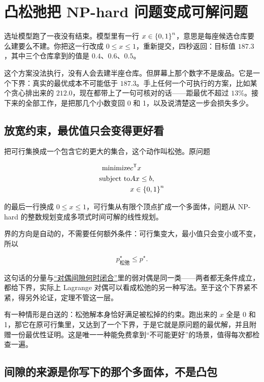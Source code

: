 \section{凸松弛把 NP-hard 问题变成可解问题}
\label{sec:09-Convex-Optimization/09-Complexity-and-Approximation/02}

选址模型跑了一夜没有结束。模型里有一行 \(x\in\left\{0,1\right\}^{n}\)，意思是每座候选仓库要么建要么不建。你把这一行改成 \(0\le x\le1\)，重新提交，四秒返回：目标值 \(187.3\)，其中三个仓库拿到的值是 \(0.4\)、\(0.6\)、\(0.5\)。

这个方案没法执行，没有人会去建半座仓库。但屏幕上那个数字不是废品。它是一个下界：真实的最优成本不可能低于 \(187.3\)。手上任何一个可执行的方案，比如某个贪心排出来的 \(212.0\)，现在都带上了一句可核对的话——距最优不超过 \(13\%\)。接下来的全部工作，是把那几个小数变回 0 和 1，以及说清楚这一步会损失多少。

\subsection{放宽约束，最优值只会变得更好看}

把可行集换成一个包含它的更大的集合，这个动作叫松弛。原问题

\[
\begin{aligned}
\text{minimize}\space&c^{\mathsf{T}}x\\
\text{subject to}\space&Ax\le b,\\
&x\in\left\{0,1\right\}^{n}
\end{aligned}
\]

的最后一行换成 \(0\le x\le1\)，可行集从有限个顶点扩成一个多面体，问题从 NP-hard 的整数规划变成多项式时间可解的线性规划。

界的方向是自动的，不需要任何额外条件：可行集变大，最小值只会变小或不变，所以

\[
p^\star_{\text{松弛}}\le p^\star.
\]

这句话的分量与\hyperref[sec:09-Convex-Optimization/05-Duality/02]{``对偶间隙何时闭合''}里的弱对偶是同一类——两者都无条件成立，都给下界，实际上 Lagrange 对偶可以看成松弛的另一种写法。至于这个下界紧不紧，得另外论证，定理不管这一层。

有一种情形是白送的：松弛解本身恰好满足被松掉的约束。跑出来的 \(x\) 全是 0 和 1，那它在原可行集里，又达到了一个下界，于是它就是原问题的最优解，并且附赠一份最优性证明。这是唯一一种能免费拿到``不可能更好''的场景，值得每次都检查一遍。

\subsection{间隙的来源是你写下的那个多面体，不是凸包}

